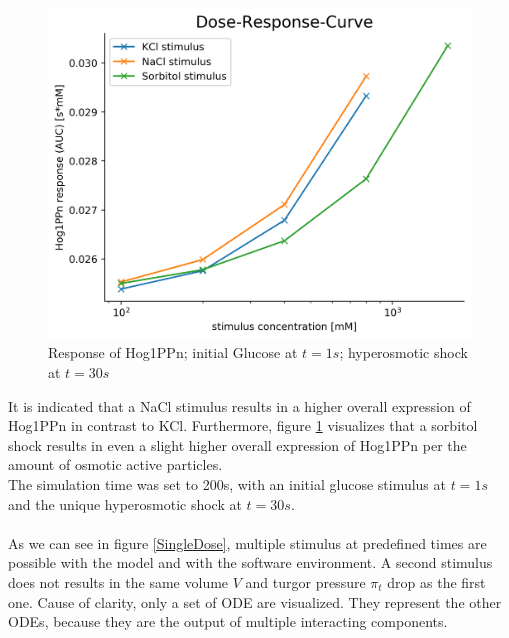 \begin{figure}[h!]
	\begin{center}
		\begin{minipage}{0,70\textwidth}
			
			\includegraphics[width=\textwidth]{picture/Drug_response.png}
			\caption{Response of Hog1PPn; initial Glucose at $t=1s$; hyperosmotic shock at $t=30s$} 
			\label{DrugResponseCurve} 
		\end{minipage}
	\end{center}
\end{figure}
It is indicated that a NaCl stimulus results in a higher overall expression of Hog1PPn in contrast to KCl. Furthermore, figure \ref{DrugResponseCurve} visualizes that a sorbitol shock results in even a slight higher overall expression of Hog1PPn per the amount of osmotic active particles.\\ The simulation time was set to 200s, with an initial glucose stimulus at $t=1s$ and the unique hyperosmotic shock at $t=30s$. \\\\
As we can see in figure \ref{SingleDose}, multiple stimulus at predefined times are possible with the model and with the software environment. A second stimulus does not results in the same volume $V$ and turgor pressure $\pi_t$ drop as the first one. Cause of clarity, only a set of ODE are visualized. They represent the other ODEs, because they are the output of multiple interacting components. \newpage
